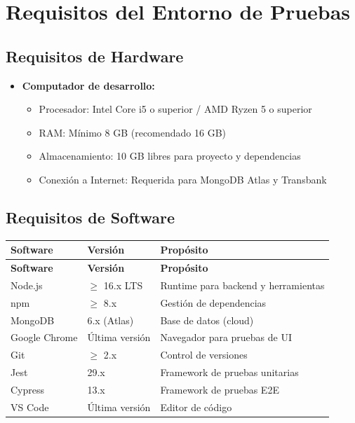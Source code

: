 \documentclass[12pt,a4paper]{article}
\begin{document}
\section{Requisitos del Entorno de Pruebas}

\subsection{Requisitos de Hardware}

\begin{itemize}
    \item \textbf{Computador de desarrollo:}
    \begin{itemize}
        \item Procesador: Intel Core i5 o superior / AMD Ryzen 5 o superior
        \item RAM: Mínimo 8 GB (recomendado 16 GB)
        \item Almacenamiento: 10 GB libres para proyecto y dependencias
        \item Conexión a Internet: Requerida para MongoDB Atlas y Transbank
    \end{itemize}
\end{itemize}

\subsection{Requisitos de Software}

\begin{longtable}{|p{4cm}|p{3cm}|p{7cm}|}
\hline
\textbf{Software} & \textbf{Versión} & \textbf{Propósito} \\
\hline
\endfirsthead
\hline
\textbf{Software} & \textbf{Versión} & \textbf{Propósito} \\
\hline
\endhead
Node.js & $\geq$ 16.x LTS & Runtime para backend y herramientas \\
\hline
npm & $\geq$ 8.x & Gestión de dependencias \\
\hline
MongoDB & 6.x (Atlas) & Base de datos (cloud) \\
\hline
Google Chrome & Última versión & Navegador para pruebas de UI \\
\hline
Git & $\geq$ 2.x & Control de versiones \\
\hline
Jest & 29.x & Framework de pruebas unitarias \\
\hline
Cypress & 13.x & Framework de pruebas E2E \\
\hline
VS Code & Última versión & Editor de código \\
\hline
\end{longtable}
\end{document}
